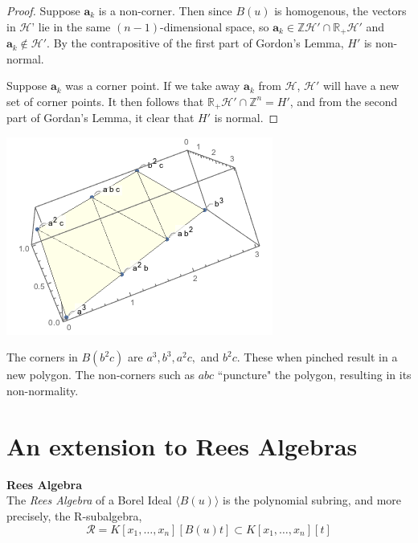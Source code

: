 \documentclass[a0, landscape]{a0poster}
\begin{document}
\begin{multicols}{4}
\begin{proof}
Suppose $\mathbf{a}_k$ is a non-corner. Then since $B(u)$ is homogenous, the vectors in $\mathcal{H}$' lie in the same $(n-1)$-dimensional space, so $\mathbf{a}_k \in \mathbb{Z}\mathcal{H}' \cap \mathbb{R}_+ \mathcal{H}'$ and $\mathbf{a}_k \notin \mathcal{H}'$. By the contrapositive of the first part of Gordon's Lemma, $H'$ is non-normal.  %

Suppose $\mathbf{a}_k$ was a corner point. If we take away $\mathbf{a}_k$ from $\mathcal{H}$,  $\mathcal{H}'$ will have a new set of corner points. It then follows that $\mathbb{R}_+\mathcal{H}' \cap \mathbb{Z}^n=H'$, and from the second part of Gordan's Lemma, it clear that $H'$ is normal. 


\end{proof} 

\begin{center}
\includegraphics[width=0.6\linewidth]{b2clattice}
\end{center}

The corners in $B(b^2c)$ are $a^3, b^3, a^2c,$ and $b^2c$. These when pinched result in a new polygon. The non-corners such as $abc$ ``puncture" the polygon, resulting in its non-normality. 

\section*{\color{DarkSlateBlue}An extension to Rees Algebras}

\begin{definition}\textbf{Rees Algebra}{\label{Rees Algebra}}\\
	The \textit{Rees Algebra} of a Borel Ideal $\langle B(u) \rangle$ is the polynomial subring, and more precisely, the R-subalgebra, 
	\[ \mathcal{R} = K[x_1, \ldots, x_n][B(u)t] \subset K[x_1, \ldots, x_n][t] \] 
\end{definition}


\end{multicols}
\end{document}
